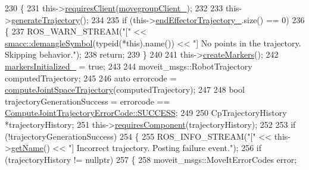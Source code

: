 \begin{DoxyCode}
230     \{
231         this->\hyperlink{classsmacc_1_1ISmaccClientBehavior_a32b16e99e3b4cb289414203dc861a440}{requiresClient}(\hyperlink{classcl__move__group__interface_1_1CbMoveEndEffectorTrajectory_aea650d3e7836125b32be97392b71a7f3}{movegroupClient\_});
232 
233         this->\hyperlink{classcl__move__group__interface_1_1CbMoveEndEffectorTrajectory_aeae938ab66e18ab7d2fb2427bc83647b}{generateTrajectory}();
234 
235         \textcolor{keywordflow}{if} (this->\hyperlink{classcl__move__group__interface_1_1CbMoveEndEffectorTrajectory_ae13dfd31ea3660646e03882f0c2c29f0}{endEffectorTrajectory\_}.size() == 0)
236         \{
237             ROS\_WARN\_STREAM(\textcolor{stringliteral}{"["} << \hyperlink{namespacesmacc_1_1introspection_a2f495108db3e57604d8d3ff5ef030302}{smacc::demangleSymbol}(\textcolor{keyword}{typeid}(*this).name()) << \textcolor{stringliteral}{"]
       No points in the trajectory. Skipping behavior."});
238             \textcolor{keywordflow}{return};
239         \}
240 
241         this->\hyperlink{classcl__move__group__interface_1_1CbMoveEndEffectorTrajectory_a442efa1d5bc9e9a16f74ecd31b13d9b5}{createMarkers}();
242         \hyperlink{classcl__move__group__interface_1_1CbMoveEndEffectorTrajectory_ac140a7f0adfb20f1e2900a5c8cd2ca5b}{markersInitialized\_} = \textcolor{keyword}{true};
243 
244         moveit\_msgs::RobotTrajectory computedTrajectory;
245 
246         \textcolor{keyword}{auto} errorcode = \hyperlink{classcl__move__group__interface_1_1CbMoveEndEffectorTrajectory_a485057c052729edd3e8303440b7ada66}{computeJointSpaceTrajectory}(computedTrajectory);
247 
248         \textcolor{keywordtype}{bool} trajectoryGenerationSuccess = errorcode == 
      \hyperlink{namespacecl__move__group__interface_ae5fc1caf9a16ae5ad1c97c2e137a7017ad0749aaba8b833466dfcbb0428e4f89c}{ComputeJointTrajectoryErrorCode::SUCCESS};
249 
250         CpTrajectoryHistory *trajectoryHistory;
251         this->\hyperlink{classsmacc_1_1ISmaccClientBehavior_a19c6d658c8e809bb93bfdc9b639a3ac3}{requiresComponent}(trajectoryHistory);
252 
253         \textcolor{keywordflow}{if} (!trajectoryGenerationSuccess)
254         \{
255             ROS\_INFO\_STREAM(\textcolor{stringliteral}{"["} << this->\hyperlink{classsmacc_1_1ISmaccClientBehavior_a18e4bec9460b010f2894c0f7e7064a34}{getName}() << \textcolor{stringliteral}{"] Incorrect trajectory. Posting failure
       event."});
256             \textcolor{keywordflow}{if} (trajectoryHistory != \textcolor{keyword}{nullptr})
257             \{
258                 moveit\_msgs::MoveItErrorCodes error;

\end{DoxyCode}
